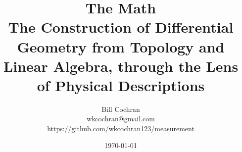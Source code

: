 \documentclass[12pt,oneside]{book}
\begin{document}
\title{The Math\\
\large The Construction of Differential Geometry from Topology and Linear
Algebra, through the Lens of Physical Descriptions}

\author{Bill Cochran\\wkcochran@gmail.com\\https://github.com/wkcochran123/measurement}
\date{\today}

\maketitle

\tableofcontents












\end{document}

